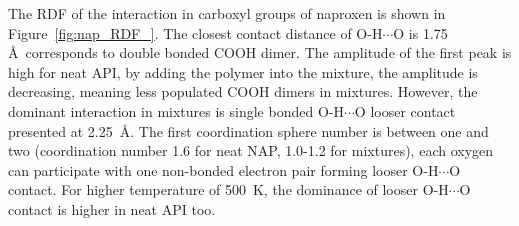 \vspace{-0.2cm}The RDF of the interaction in carboxyl groups of naproxen is shown in Figure~\ref{fig:nap_RDF_}. The closest contact distance of O-H$\cdots$O is 1.75 \AA~corresponds to double bonded COOH dimer. The amplitude of the first peak is high for neat API, by adding the polymer into the mixture, the amplitude is decreasing, meaning less populated COOH dimers in mixtures. However, the dominant interaction in mixtures is single bonded O-H$\cdots$O looser contact presented at 2.25~\AA. The first coordination sphere number is between one and two (coordination number 1.6 for neat NAP, 1.0-1.2 for mixtures), each oxygen can participate with one non-bonded electron pair forming looser O-H$\cdots$O contact. For higher temperature of 500~K, the dominance of looser O-H$\cdots$O contact is higher in neat API too.


